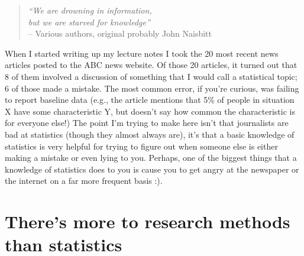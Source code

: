 \documentclass[
]{book}
\begin{document}
\begin{quote}
\emph{``We are drowning in information,\\
but we are starved for knowledge''}\\

-- Various authors, original probably John Naisbitt
\end{quote}

When I started writing up my lecture notes I took the 20 most recent news articles posted to the ABC news website. Of those 20 articles, it turned out that 8 of them involved a discussion of something that I would call a statistical topic; 6 of those made a mistake. The most common error, if you're curious, was failing to report baseline data (e.g., the article mentions that 5\% of people in situation X have some characteristic Y, but doesn't say how common the characteristic is for everyone else!) The point I'm trying to make here isn't that journalists are bad at statistics (though they almost always are), it's that a basic knowledge of statistics is very helpful for trying to figure out when someone else is either making a mistake or even lying to you. Perhaps, one of the biggest things that a knowledge of statistics does to you is cause you to get angry at the newspaper or the internet on a far more frequent basis :).

\hypertarget{theres-more-to-research-methods-than-statistics}{%
\section{There's more to research methods than statistics}\label{theres-more-to-research-methods-than-statistics}}
\end{document}
